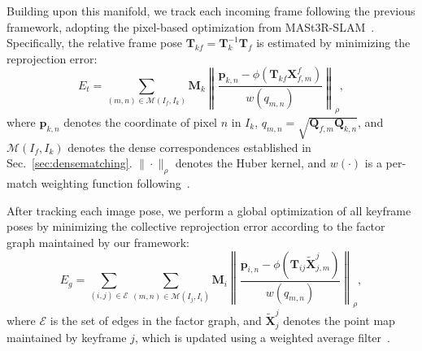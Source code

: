 Building upon this manifold, we track each incoming frame following the previous framework, adopting the pixel-based optimization from MASt3R-SLAM~\cite{murai2024_mast3rslam}. Specifically, the relative frame pose $\mathbf{T}_{kf} = \mathbf{T}_k^{-1} \mathbf{T}_f$ is estimated by minimizing the reprojection error:
\begin{equation}
E_{t} = \sum_{(m,n) \in \mathcal{M}(I_f, I_k)} \mathbf{M}_k
\left\| 
\frac{\mathbf{p}_{k,n} - \phi \left( \mathbf{T}_{kf}\mathbf{X}^f_{f,m} \right)}
{w(q_{m,n})}
\right\|_\rho ,
\end{equation}
where $\mathbf{p}_{k,n}$ denotes the coordinate of pixel $n$ in $I_k$, 
$q_{m,n} = \sqrt{\mathbf{Q}_{f,m} \mathbf{Q}_{k,n}}$, and 
$\mathcal{M}(I_f, I_k)$ denotes the dense correspondences established in Sec.~\ref{sec:densematching}. 
$\|\cdot\|_\rho$ denotes the Huber kernel, and $w(\cdot)$ is a per-match weighting function following~\cite{murai2024_mast3rslam}.

After tracking each image pose, we perform a global optimization of all keyframe poses by minimizing the collective reprojection error according to the factor graph maintained by our framework:
\begin{equation}
E_{g} = \sum_{(i,j) \in \mathcal{E}} \sum_{(m, n) \in \mathcal{M}(I_j, I_i)} \mathbf{M}_i \left\| \frac{\mathbf{p}_{i,n} - \phi \left( \mathbf{T}_{ij}\tilde{\mathbf{X}}^j_{j,m} \right)}{w(q_{m,n})} \right\|_\rho,
\end{equation}
where $\mathcal{E}$ is the set of edges in the factor graph, and $\tilde{\mathbf{X}}^j_{j}$ denotes the point map maintained by keyframe $j$, which is updated using a weighted average filter~\cite{murai2024_mast3rslam}.

